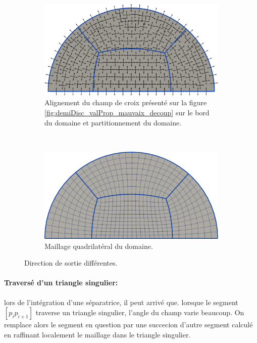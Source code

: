 \begin{figure}[!h]
\centering
\begin{subfigure}{0.65\textwidth}
    \includegraphics[width=\textwidth]{images/demi_disc_second_phi_first.pdf}
    \caption{Alignement du champ de croix présenté sur la figure \ref{fig:demiDisc_valProp_mauvaix_decoup} sur le bord du domaine et partitionnement du domaine.}
    \label{fig:first_dir_first}
\end{subfigure}
\\[0.5cm]
\begin{subfigure}{0.65\textwidth}
    \includegraphics[width=\textwidth]{images/demi_disc_second_phi_second.pdf}
    \caption{Maillage quadrilatéral du domaine.}
    \label{fig:first_dir_second}
\end{subfigure}        
\caption{Direction de sortie différentes.}
\label{fig:first_dir}
\end{figure}


\paragraph{Traversé d'un triangle singulier:} lors de l'intégration d'une séparatrice, il peut arrivé que. lorsque le segment $[p_ip_{i+1}]$ traverse un triangle singulier, l'angle du champ varie beaucoup. On remplace alors le segment en question par une succecion d'autre segment calculé en raffinant localement le maillage dans le triangle singulier.

